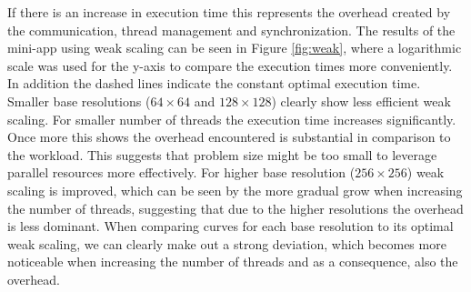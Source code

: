 If there is an increase in execution time this represents the overhead created by the communication, thread management and synchronization. The results of the mini-app using weak scaling can be seen in Figure \ref{fig:weak}, where a logarithmic scale was used for the y-axis to compare the execution times more conveniently. In addition the dashed lines indicate the constant optimal execution time. Smaller base resolutions ($64 \times 64$ and $128\times128$) clearly show less efficient weak scaling. For smaller number of threads the execution time increases significantly. Once more this shows the overhead encountered is substantial in comparison to the workload. This suggests that problem size might be too small to leverage parallel resources more effectively. For higher base resolution ($256 \times 256$) weak scaling is improved, which can be seen by the more gradual grow when increasing the number of threads, suggesting that due to the higher resolutions the overhead is less dominant. When comparing curves for each base resolution to its optimal weak scaling, we can clearly make out a strong deviation, which becomes more noticeable when increasing the number of threads and as a consequence, also the overhead.

